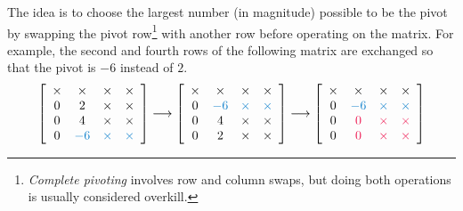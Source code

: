 The idea is to choose the largest number (in magnitude) possible to be the pivot by swapping the pivot row\footnote{\emph{Complete pivoting} involves row and column swaps, but doing both operations is usually considered overkill.}
 with another row before operating on the matrix.
For example, the second and fourth rows of the following matrix are exchanged so that the pivot is $-6$ instead of $2$.
%
\begin{align*}
\left[\begin{array}{cccc}
\times & \times & \times & \times\\
0 & 2 & \times & \times\\
0 & 4 & \times & \times\\
0 & \textcolor{blue}{-6} & \textcolor{blue}\times & \textcolor{blue}\times\\
\end{array}\right]
\longrightarrow
\left[\begin{array}{cccc}
\times & \times & \times & \times\\
0 & \textcolor{blue}{-6} & \textcolor{blue}\times & \textcolor{blue}\times\\
0 & 4 & \times & \times\\
0 & 2 & \times & \times\\
\end{array}\right]
\longrightarrow
\left[\begin{array}{cccc}
\times & \times & \times & \times\\
0 & \textcolor{blue}{-6} & \textcolor{blue}\times & \textcolor{blue}\times\\
0 & \textcolor{red}0 & \textcolor{red}\times & \textcolor{red}\times\\
0 & \textcolor{red}0 & \textcolor{red}\times & \textcolor{red}\times\\
\end{array}\right]
\end{align*}

